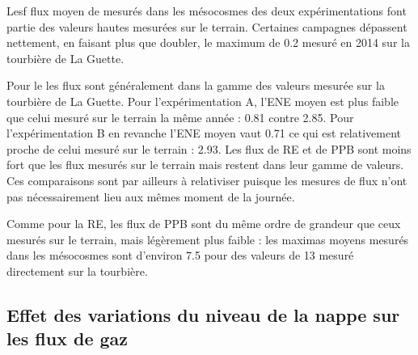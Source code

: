Lesf flux moyen de \chh mesurés dans les mésocosmes des deux expérimentations font partie des valeurs hautes mesurées sur le terrain.
Certaines campagnes dépassent nettement, en faisant plus que doubler, le maximum de \SI{0.2}{\uml} mesuré en 2014 sur la tourbière de La Guette.

Pour le \coo les flux sont généralement dans la gamme des valeurs mesurée sur la tourbière de La Guette.
Pour l'expérimentation A, l'ENE moyen est plus faible que celui mesuré sur le terrain la même année : \num{0.81} contre \SI{2.85}{\uml}.
Pour l'expérimentation B en revanche l'ENE moyen vaut \SI{0.71}{\uml} ce qui est relativement proche de celui mesuré sur le terrain : \SI{2.93}{\uml}.
Les flux de RE et de PPB sont moins fort que les flux mesurés sur le terrain mais restent dans leur gamme de valeurs.
Ces comparaisons sont par ailleurs à relativiser puisque les mesures de flux n'ont pas nécessairement lieu aux mêmes moment de la journée.


%
%
%


Comme pour la RE, les flux de PPB sont du même ordre de grandeur que ceux mesurés sur le terrain, mais légèrement plus faible : les maximas moyens mesurés dans les mésocosmes sont d'environ \num{7.5} pour des valeurs de \SI{13}{\uml} mesuré directement sur la tourbière.

\subsection{Effet des variations du niveau de la nappe sur les flux de gaz}

